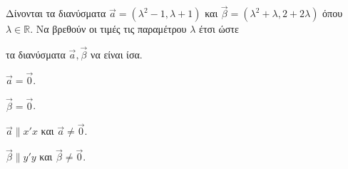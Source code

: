 Δίνονται τα διανύσματα $ \vec{a}=(\lambda^2-1,\lambda+1) $ και $ \vec{\beta}=(\lambda^2+\lambda,2+2\lambda) $ όπου $ \lambda\in\mathbb{R} $. Να βρεθούν οι τιμές τις παραμέτρου $ \lambda $ έτσι ώστε
\begin{alist}
\item τα διανύσματα $ \vec{a},\vec{\beta} $ να είναι ίσα.
\item $ \vec{a}=\vec{0} $.
\item $ \vec{\beta}=\vec{0} $.
\item $\vec{a}\parallel x'x$ και $ \vec{a}\neq\vec{0} $.
\item $ \vec{\beta}\parallel y'y $ και $ \vec{\beta}\neq\vec{0} $.
\end{alist}
